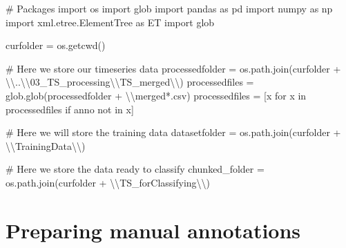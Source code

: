 \documentclass[
  letterpaper,
  DIV=11,
  numbers=noendperiod]{scrreprt}
\newenvironment{Shaded}{\begin{snugshade}}{\end{snugshade}}
\newcommand{\CharTok}[1]{\textcolor[rgb]{0.13,0.47,0.30}{#1}}
\newcommand{\CommentTok}[1]{\textcolor[rgb]{0.37,0.37,0.37}{#1}}
\newcommand{\ControlFlowTok}[1]{\textcolor[rgb]{0.00,0.23,0.31}{#1}}
\newcommand{\ImportTok}[1]{\textcolor[rgb]{0.00,0.46,0.62}{#1}}
\newcommand{\KeywordTok}[1]{\textcolor[rgb]{0.00,0.23,0.31}{#1}}
\newcommand{\NormalTok}[1]{\textcolor[rgb]{0.00,0.23,0.31}{#1}}
\newcommand{\OperatorTok}[1]{\textcolor[rgb]{0.37,0.37,0.37}{#1}}
\newcommand{\StringTok}[1]{\textcolor[rgb]{0.13,0.47,0.30}{#1}}
\begin{document}
\begin{Shaded}
\begin{Highlighting}[]
\CommentTok{\# Packages}
\ImportTok{import}\NormalTok{ os}
\ImportTok{import}\NormalTok{ glob}
\ImportTok{import}\NormalTok{ pandas }\ImportTok{as}\NormalTok{ pd}
\ImportTok{import}\NormalTok{ numpy }\ImportTok{as}\NormalTok{ np}
\ImportTok{import}\NormalTok{ xml.etree.ElementTree }\ImportTok{as}\NormalTok{ ET}
\ImportTok{import}\NormalTok{ glob}


\NormalTok{curfolder }\OperatorTok{=}\NormalTok{ os.getcwd()}

\CommentTok{\# Here we store our timeseries data}
\NormalTok{processedfolder }\OperatorTok{=}\NormalTok{ os.path.join(curfolder }\OperatorTok{+} \StringTok{\textquotesingle{}}\CharTok{\textbackslash{}\textbackslash{}}\StringTok{..}\CharTok{\textbackslash{}\textbackslash{}}\StringTok{03\_TS\_processing}\CharTok{\textbackslash{}\textbackslash{}}\StringTok{TS\_merged}\CharTok{\textbackslash{}\textbackslash{}}\StringTok{\textquotesingle{}}\NormalTok{)}
\NormalTok{processedfiles }\OperatorTok{=}\NormalTok{ glob.glob(processedfolder }\OperatorTok{+} \StringTok{\textquotesingle{}}\CharTok{\textbackslash{}\textbackslash{}}\StringTok{merged*.csv\textquotesingle{}}\NormalTok{)}
\NormalTok{processedfiles }\OperatorTok{=}\NormalTok{ [x }\ControlFlowTok{for}\NormalTok{ x }\KeywordTok{in}\NormalTok{ processedfiles }\ControlFlowTok{if} \StringTok{\textquotesingle{}anno\textquotesingle{}} \KeywordTok{not} \KeywordTok{in}\NormalTok{ x]}

\CommentTok{\# Here we will store the training data}
\NormalTok{datasetfolder }\OperatorTok{=}\NormalTok{ os.path.join(curfolder }\OperatorTok{+} \StringTok{\textquotesingle{}}\CharTok{\textbackslash{}\textbackslash{}}\StringTok{TrainingData}\CharTok{\textbackslash{}\textbackslash{}}\StringTok{\textquotesingle{}}\NormalTok{)}

\CommentTok{\# Here we store the data ready to classify}
\NormalTok{chunked\_folder }\OperatorTok{=}\NormalTok{ os.path.join(curfolder }\OperatorTok{+} \StringTok{\textquotesingle{}}\CharTok{\textbackslash{}\textbackslash{}}\StringTok{TS\_forClassifying}\CharTok{\textbackslash{}\textbackslash{}}\StringTok{\textquotesingle{}}\NormalTok{)}
\end{Highlighting}
\end{Shaded}


\chapter{Preparing manual
annotations}\label{preparing-manual-annotations}
\end{document}
